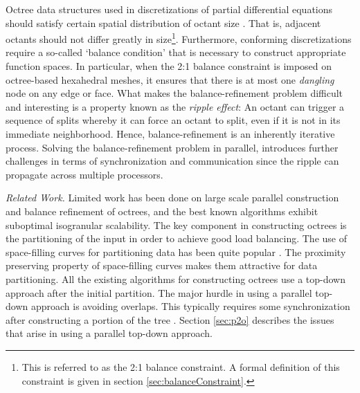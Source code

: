 Octree data structures used in discretizations of partial differential
equations should satisfy certain spatial distribution of octant size
\cite{bern99, tu05}. That is, adjacent octants should not differ
greatly in size\footnote{This is referred to as the 2:1 balance
constraint. A formal definition of this constraint is given in section
\ref{sec:balanceConstraint}.}. Furthermore, conforming discretizations
require a so-called `balance condition' that is necessary to construct
appropriate function spaces.  In particular, when the 2:1 balance
constraint is imposed on octree-based hexahedral meshes, it ensures
that there is at most one {\em dangling} node on any edge or face.
What makes the balance-refinement problem difficult and interesting is
a property known as the {\em ripple effect}: An octant can trigger a
sequence of splits whereby it can force an octant to split, even if it
is not in its immediate neighborhood. Hence, balance-refinement is an
inherently iterative process. Solving the balance-refinement problem
in parallel, introduces further challenges in terms of synchronization
and communication since the ripple can propagate across multiple
processors.

{\em{Related Work.}} Limited work has been done on large scale
parallel construction \cite{ aluru02, warren93, ying03} and balance
refinement \cite{ kim02, tu05} of octrees, and the best known
algorithms exhibit suboptimal isogranular scalability.  The key
component in constructing octrees is the partitioning of the input in
order to achieve good load balancing. The use of space-filling curves
for partitioning data has been quite popular \cite{ aluru02, tu05,
warren93, ying03}. The proximity preserving property of space-filling
curves makes them attractive for data partitioning. All the existing
algorithms for constructing octrees use a top-down approach after the
initial partition. The major hurdle in using a parallel top-down
approach is avoiding overlaps. This typically requires some
synchronization after constructing a portion of the tree \cite{ tu05,
warren93, ying03}. Section \ref{sec:p2o} describes the issues that
arise in using a parallel top-down approach.

